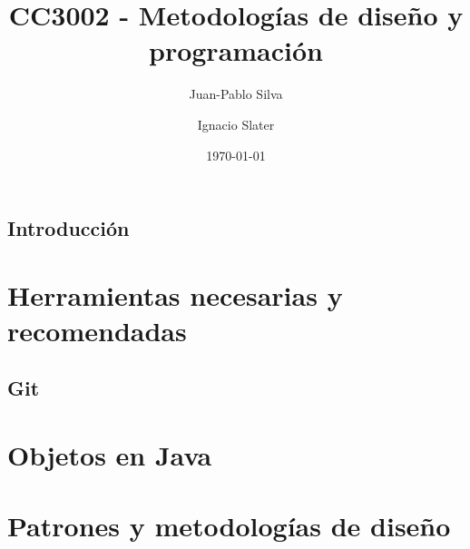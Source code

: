 \documentclass[12pt]{book}
\title{CC3002 - Metodologías de diseño y programación}
\author{Juan-Pablo Silva}
\author{Ignacio Slater}
\affil{Departamento de Ciencias de la Computación, Universidad de Chile}
\date{\today}
\begin{document}
  \frontmatter
  \maketitle
  \tableofcontents
  \chapter{Introducción}

  \mainmatter
  \part{Herramientas necesarias y recomendadas}
    \chapter{Git}
  \part{Objetos en Java}
    
  \part{Patrones y metodologías de diseño}
    \label{pt:design}
\end{document}
